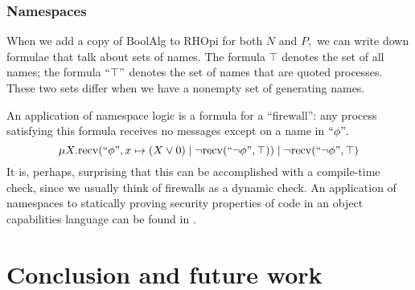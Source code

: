 \documentclass{llncs}
\newcommand{\recv}{\mathrm{recv}}
\renewcommand{\quote}[1]{``#1"}
\begin{document}
\subsubsection{Namespaces}

When we add a copy of BoolAlg to RHOpi for both $N$ and $P,$ we can write down formulae that talk about sets of names.  The formula $\top$ denotes the set of all names; the formula $\quote{\top}$ denotes the set of names that are quoted processes.  These two sets differ when we have a nonempty set of generating names.

An application of namespace logic is a formula for a ``firewall'': any process satisfying this formula receives no messages except on a name in $\quote{\phi}.$
\[ \mu X. \recv(\quote{\phi}, x \mapsto (X \lor 0)\;|\;\neg\recv(\quote{\neg \phi}, \top))\;|\;\neg\recv(\quote{\neg \phi}, \top) \]
It is, perhaps, surprising that this can be accomplished with a compile-time check, since we usually think of firewalls as a dynamic check.  An application of namespaces to statically proving security properties of code in an object capabilities language can be found in \cite{DBLP:journals/corr/MeredithSD13}.

\section{Conclusion and future work}


\end{document}
